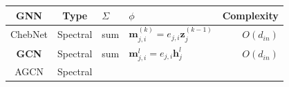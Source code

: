 \begin{table}
    \hspace{-5em}
    \begin{footnotesize}
        \begin{tabular}{ccp{8em}p{22em}r}
            \toprule
            GNN                                                                                                                       &
            Type                                                                                                                      &
            $\Sigma$                                                                                                                  &
            $\phi$                                                                                                                    &
            Complexity                                                                                                                  \\ \midrule
            ChebNet \cite{defferrad2016_chebnet}                                                                                      &
            Spectral                                                                                                                  &
            sum                                                                                                                       &
            $\boldsymbol{m}_{j, i}^{(k)} = e_{j, i}\boldsymbol{z}_j^{(k-1)}$                                                          &
            $O(d_{in})$                                                                                                                 \\
            \textbf{GCN} \cite{kipf2017_gcn}                                                                                          &
            Spectral                                                                                                                  &
            sum                                                                                                                       &
            $\boldsymbol{m}_{j, i}^l = e_{j, i} \boldsymbol{h}_j^l$                                                                   &
            $O(d_{in})$                                                                                                                 \\
            AGCN \cite{li2018_agcn}                                                                                                   &
            Spectral                                                                                                                  &

\end{tabular}
\end{footnotesize}
\end{table}
